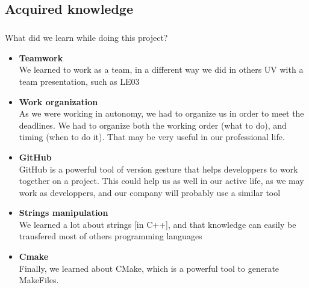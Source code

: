 \documentclass[12pt,a4paper,twoside]{article}
\begin{document}
		\subsection{Acquired knowledge} %
			\subparagraph*{}
				What did we learn while doing this project?
				\begin{itemize}
					\item{} \textbf{Teamwork}\\
						We learned to work as a team, in a different way we did in others UV with a team presentation, such as LE03
					\item{} \textbf{Work organization}\\
						As we were working in autonomy, we had to organize us in order to meet the deadlines. We had to organize both the working order (what to do), and timing (when to do it). That may be very useful in our professional life.
					\item{} \textbf{GitHub}\\
						GitHub is a powerful tool of version gesture that helps developpers to work together on a project. This could help us as well in our active life, as we may work as developpers, and our company will probably use a similar tool
					\item{} \textbf{Strings manipulation}\\
						We learned a lot about strings [in C++], and that knowledge can easily be transfered most of others programming languages
					\item{} \textbf{Cmake}\\
						Finally, we learned about CMake, which is a powerful tool to generate MakeFiles.
				\end{itemize}
\end{document}
